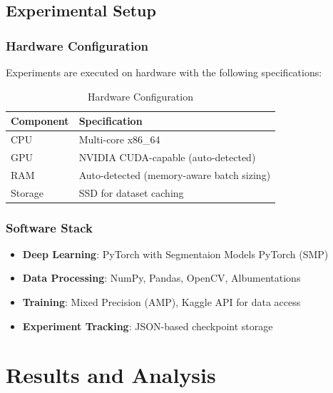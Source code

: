 \documentclass[11pt,a4paper,twoside]{report}
\begin{document}
\section{Experimental Setup}

\subsection{Hardware Configuration}

Experiments are executed on hardware with the following specifications:

\begin{table}[htbp]
\centering
\caption{Hardware Configuration}
\label{tab:hardware}
\begin{tabular}{ll}
\toprule
\textbf{Component} & \textbf{Specification} \\
\midrule
CPU & Multi-core x86\_64 \\
GPU & NVIDIA CUDA-capable (auto-detected) \\
RAM & Auto-detected (memory-aware batch sizing) \\
Storage & SSD for dataset caching \\
\bottomrule
\end{tabular}
\end{table}

\subsection{Software Stack}

\begin{itemize}
    \item \textbf{Deep Learning}: PyTorch with Segmentaion Models PyTorch (SMP)
    \item \textbf{Data Processing}: NumPy, Pandas, OpenCV, Albumentations
    \item \textbf{Training}: Mixed Precision (AMP), Kaggle API for data access
    \item \textbf{Experiment Tracking}: JSON-based checkpoint storage
\end{itemize}

\chapter{Results and Analysis}\label{chap:results}
\end{document}
